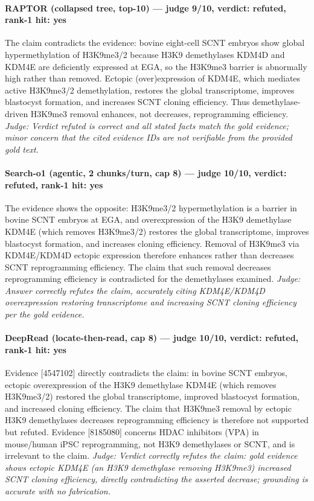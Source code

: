 \documentclass[sigconf, review, anonymous]{acmart}
\begin{document}
\paragraph{RAPTOR (collapsed tree, top-10) --- judge 9/10, verdict: refuted, rank-1 hit: yes}
\noindent The claim contradicts the evidence: bovine eight-cell SCNT embryos show global hypermethylation of H3K9me3/2 because H3K9 demethylases KDM4D and KDM4E are deficiently expressed at EGA, so the H3K9me3 barrier is abnormally high rather than removed. Ectopic (over)expression of KDM4E, which mediates active H3K9me3/2 demethylation, restores the global transcriptome, improves blastocyst formation, and increases SCNT cloning efficiency. Thus demethylase-driven H3K9me3 removal enhances, not decreases, reprogramming efficiency.
\noindent\small\textit{Judge: Verdict refuted is correct and all stated facts match the gold evidence; minor concern that the cited evidence IDs are not verifiable from the provided gold text.}
\paragraph{Search-o1 (agentic, 2 chunks/turn, cap 8) --- judge 10/10, verdict: refuted, rank-1 hit: yes}
\noindent The evidence shows the opposite: H3K9me3/2 hypermethylation is a barrier in bovine SCNT embryos at EGA, and overexpression of the H3K9 demethylase KDM4E (which removes H3K9me3/2) restores the global transcriptome, improves blastocyst formation, and increases cloning efficiency. Removal of H3K9me3 via KDM4E/KDM4D ectopic expression therefore enhances rather than decreases SCNT reprogramming efficiency. The claim that such removal decreases reprogramming efficiency is contradicted for the demethylases examined.
\noindent\small\textit{Judge: Answer correctly refutes the claim, accurately citing KDM4E/KDM4D overexpression restoring transcriptome and increasing SCNT cloning efficiency per the gold evidence.}
\paragraph{DeepRead (locate-then-read, cap 8) --- judge 10/10, verdict: refuted, rank-1 hit: yes}
\noindent Evidence [4547102] directly contradicts the claim: in bovine SCNT embryos, ectopic overexpression of the H3K9 demethylase KDM4E (which removes H3K9me3/2) restored the global transcriptome, improved blastocyst formation, and increased cloning efficiency. The claim that H3K9me3 removal by ectopic H3K9 demethylases decreases reprogramming efficiency is therefore not supported but refuted. Evidence [8185080] concerns HDAC inhibitors (VPA) in mouse/human iPSC reprogramming, not H3K9 demethylases or SCNT, and is irrelevant to the claim.
\noindent\small\textit{Judge: Verdict correctly refutes the claim: gold evidence shows ectopic KDM4E (an H3K9 demethylase removing H3K9me3) increased SCNT cloning efficiency, directly contradicting the asserted decrease; grounding is accurate with no fabrication.}
\end{document}
